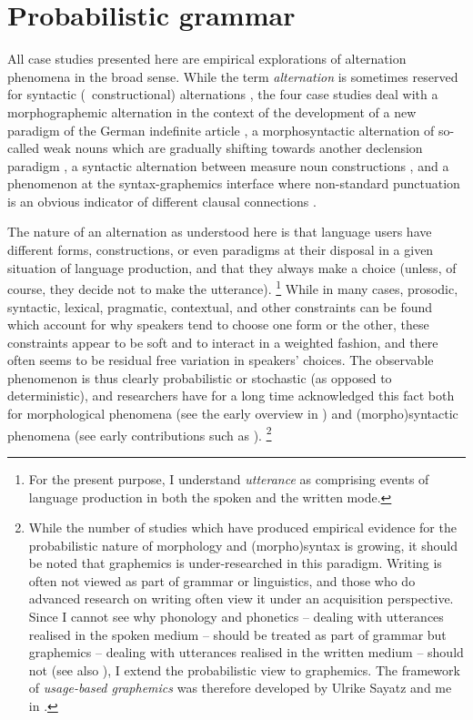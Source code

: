 \section{Probabilistic grammar}
\label{sec:probabilisticgrammar}

All case studies presented here are empirical explorations of alternation phenomena in the broad sense.
While the term \textit{alternation} is sometimes reserved for syntactic (\ie\ constructional) alternations \citep{Gries2017a}, the four case studies deal with a morphographemic alternation in the context of the development of a new paradigm of the German indefinite article \RDefArt, a morphosyntactic alternation of so-called weak nouns which are gradually shifting towards another declension paradigm \RWeakN, a syntactic alternation between measure noun constructions \RMeasure, and a phenomenon at the syntax-graphemics interface where non-standard punctuation is an obvious indicator of different clausal connections \RWeil.

The nature of an alternation as understood here is that language users have different forms, constructions, or even paradigms at their disposal in a given situation of language production, and that they always make a choice (unless, of course, they decide not to make the utterance).%
\footnote{For the present purpose, I understand \textit{utterance} as comprising events of language production in both the spoken and the written mode.}
While in many cases, prosodic, syntactic, lexical, pragmatic, contextual, and other constraints can be found which account for why speakers tend to choose one form or the other, these constraints appear to be soft and to interact in a weighted fashion, and there often seems to be residual free variation in speakers' choices.
The observable phenomenon is thus clearly probabilistic or stochastic (as opposed to deterministic), and researchers have for a long time acknowledged this fact both for morphological phenomena (see the early overview in \citealt{HayBaayen2005}) and (morpho)syntactic phenomena (see early contributions such as \citealt{Gries2003,Wulff2003,Bresnan2007,Bresnan2007}).%
\footnote{While the number of studies which have produced empirical evidence for the probabilistic nature of morphology and (morpho)syntax is growing, it should be noted that graphemics is under-researched in this paradigm.
Writing is often not viewed as part of grammar or linguistics, and those who do advanced research on writing often view it under an acquisition perspective.
Since I cannot see why phonology and phonetics -- dealing with utterances realised in the spoken medium -- should be treated as part of grammar but graphemics -- dealing with utterances realised in the written medium -- should not (see also \citealt[495--500]{Schaefer2016e}), I extend the probabilistic view to graphemics.
The framework of \textit{usage-based graphemics} was therefore developed by Ulrike Sayatz and me in \ROWeil.
}

